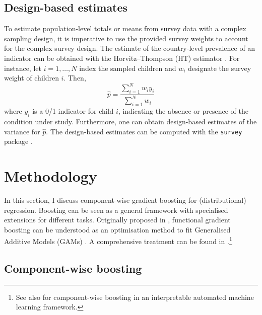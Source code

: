 \subsection{Design-based estimates}\label{sec:design-based-estimates}

To estimate population-level totals or means from survey data with a complex sampling design, it is imperative to use the provided survey weights to account for the complex survey design. The estimate of the country-level prevalence of an indicator can be obtained with the Horvitz–Thompson (HT) estimator \autocite{horvitzGeneralizationSamplingReplacement1952}. For instance, let $i = 1, \dots, N$ index the sampled children and $w_i$ designate the survey weight of children $i$. Then,
\begin{equation*}
	\hat{p} = \frac{\sum_{i = 1}^{N} w_i y_i}{\sum_{i = 1}^{N} w_i}
\end{equation*}
where $y_i$ is a 0/1 indicator for child $i$, indicating the absence or presence of the condition under study. Furthermore, one can obtain design-based estimates of the variance for $\hat{p}$. The design-based estimates can be computed with the {\tt survey} package \autocite{lumleyAnalysisComplexSurvey2004}. 



\section{Methodology}\label{sec:methodology}

In this section, I discuss component-wise gradient boosting for (distributional) regression. Boosting can be seen as a general framework with specialised extensions for different tasks. Originally proposed in \textcite{friedmanAdditiveLogisticRegression2000, buhlmannBoostingLossRegression2003}, functional gradient boosting can be understood as an optimisation method to fit Generalised Additive Models (GAMs) \autocite{hastieGeneralizedAdditiveModels1986, woodGeneralizedAdditiveModels2017a}. A comprehensive treatment can be found in \textcite{buhlmannBoostingAlgorithmsRegularization2007}.\footnote{See also \textcite{coorsAutomaticComponentwiseBoosting2021} for component-wise boosting in an interpretable automated machine learning framework.}  


\subsection{Component-wise boosting}\label{sec:component-wise-boosting}

